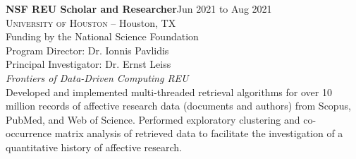 \documentclass[hidelinks, 10.5pt]{article}
\def\contentwidth{0.9\linewidth}    %
\def\contentheaderspacing{1mm}      %
\begin{document}
{\begin{minipage}[ct]{\contentwidth}
    \textbf{NSF REU Scholar and Researcher}\hfill Jun 2021 to Aug 2021\\
    \textsc{University of Houston} -- Houston, TX\\
    Funding by the National Science Foundation\\
    Program Director: Dr. Ionnis Pavlidis\\
    Principal Investigator: Dr. Ernst Leiss
    \vspace{\contentheaderspacing}\\
    {\textit{Frontiers of Data-Driven Computing REU}}\\
    Developed and implemented multi-threaded retrieval algorithms for over 10 million records of affective research data (documents and
    authors) from Scopus, PubMed, and Web of Science. Performed exploratory clustering and co-occurrence matrix analysis of retrieved
    data to facilitate the investigation of a quantitative history of affective research.
\end{minipage}

\vspace{2mm}


}
\end{document}
